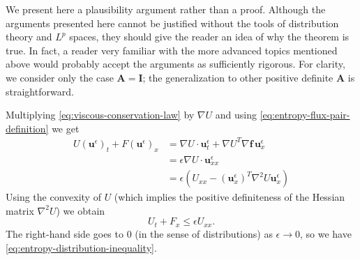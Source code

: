 \begin{Proof}
We present here a plausibility argument rather than a proof. Although the arguments presented here cannot be justified without the tools of distribution theory and $L^p$ spaces, they should give the reader an idea of why the theorem is true. In fact, a reader very familiar with the more advanced topics mentioned above would probably accept the arguments as sufficiently rigorous. For clarity, we consider only the case $\bm{A}=\bm{I}$; the generalization to other positive definite $\bm{A}$ is straightforward.

Multiplying \eqref{eq:viscous-conservation-law} by $\nabla U$ and using \eqref{eq:entropy-flux-pair-definition} we get
\[
\begin{aligned}
U(\bm{u}^\epsilon)_t+F(\bm{u}^\epsilon)_x
&=\nabla U\cdot\bm{u}_t^\epsilon+\nabla U^T\nabla\bm{f}\,\bm{u}_x^\epsilon\\
&=\epsilon\nabla U\cdot\bm{u}_{xx}^\epsilon\\
&=\epsilon(U_{xx}-(\bm{u}_x^\epsilon)^T\nabla^2U\bm{u}_x^\epsilon)
\end{aligned}
\]
Using the convexity of $U$ (which implies the positive definiteness of the Hessian matrix $\nabla^2U$) we obtain
\begin{equation}\label{eq:viscous-entropy-differential-inequality}
U_t+F_x\leq\epsilon U_{xx}.
\end{equation}
The right-hand side goes to $0$ (in the sense of distributions) as $\epsilon\to0$, so we have \eqref{eq:entropy-distribution-inequality}.
\end{Proof}
